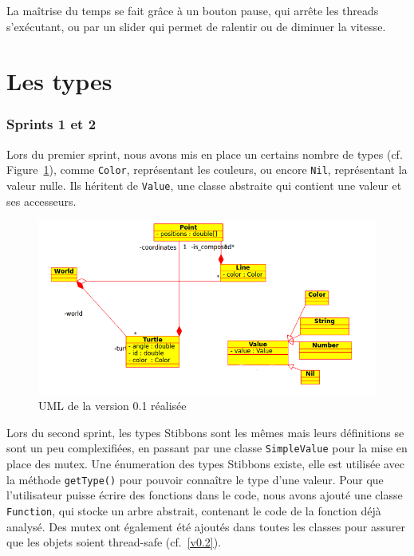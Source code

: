 La maîtrise du temps se fait grâce à un bouton pause, qui arrête les threads s'exécutant, ou par un slider qui permet de ralentir ou de diminuer la vitesse.

\section{Les types}
\subsubsection{Sprints 1 et 2}
Lors du premier sprint, nous avons mis en place un certains nombre de types (cf. Figure~\ref{v0.1R}), comme \verb|Color|, représentant les couleurs, ou encore \verb|Nil|, représentant la valeur nulle. Ils héritent de \verb|Value|, une classe abstraite qui contient une valeur et ses accesseurs.

\begin{figure}[h]
\centering
\includegraphics[scale=0.5]{doc/report/uml/v01reel.png}
\caption{\label{v0.1R} UML de la version 0.1 réalisée}
\end{figure}

Lors du second sprint, les types Stibbons sont les mêmes mais leurs définitions se sont un peu complexifiées, en passant par une classe \verb|SimpleValue| pour la mise en place des mutex. Une énumeration des types Stibbons existe, elle est utilisée avec la méthode \verb|getType()| pour pouvoir connaître le type d'une valeur.
Pour que l'utilisateur puisse écrire des fonctions dans le code, nous avons ajouté une classe \verb|Function|, qui stocke un arbre abstrait, contenant le code de la fonction déjà analysé.
Des mutex ont également été ajoutés dans toutes les classes pour assurer que les objets soient thread-safe (cf.~\ref{v0.2}).

